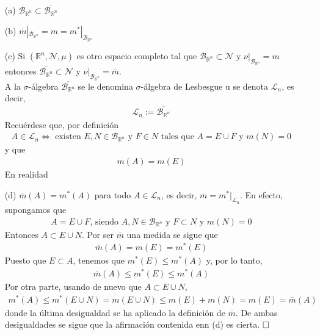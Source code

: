 \begin{enumerate}
    \item[(a)] $\mathcal{B}_{\mathbb{R}^n} \subset \overline{\mathcal{B}_{\mathbb{R}^n}}$
    \item[(b)] $\overline{m}|_{\mathcal{B}_{\mathbb{R}^n}} = m = m^*|_{\mathcal{B}_{\mathbb{R}^n}}$
    \item[(c)] Si $(\mathbb{R}^n, \mathcal{N}, \mu)$ es otro espacio completo tal que $\mathcal{B}_{\mathbb{R}^n} \subset \mathcal{N}$ y $\nu |_{\mathcal{B}_{\mathbb{R}^n}} = m$ entonces $\overline{\mathcal{B}_{\mathbb{R}^n}} \subset \mathcal{N}$ y $\nu |_{\overline{\mathcal{B}_{\mathbb{R}^n}}} = \overline{m}$.
    \\
    \newline
    A la $\sigma$-álgebra $\overline{\mathcal{B}_{\mathbb{R}^n}}$ se le denomina $\sigma$-álgebra de Lesbesgue u se denota $\mathcal{L}_n$, es decir,
    \begin{align*}
        \mathcal{L}_n := \overline{\mathcal{B}_{\mathbb{R}^n}}
    \end{align*}
    Recuérdese que, por definición
    \begin{align*}
        A \in \mathcal{L}_n \Longleftrightarrow \text{ existen } E, N \in \mathcal{B}_{\mathbb{R}^n} \text{ y } F \in N \text{ tales que } A = E \cup F \text{ y } m(N) = 0
    \end{align*}
    y que
    \begin{align*}
        m(A) = m(E)
    \end{align*}
    En realidad
    \item[(d)] $\overline{m}(A) = m^*(A)$ para todo $A \in \mathcal{L}_n$, es decir, $\overline{m} = m^*|_{\mathcal{L}_n}$. En efecto, supongamos que 
    \begin{align*}
        A = E \cup F \text{, siendo } A,N \in \mathcal{B}_{\mathbb{R}^n} \text{ y } F \subset N \text{ y } m(N) = 0
    \end{align*} 
    Entonces $A \subset E \cup N$. Por ser $\overline{m}$ una medida se sigue que
    \begin{align*}
        \overline{m}(A) = m(E) = m^*(E)
    \end{align*}
    Puesto que $E \subset A$, tenemos que $m^*(E) \leq m^*(A)$ y, por lo tanto,
    \begin{align*}
        \overline{m}(A) \leq m^*(E) \leq m^*(A)
    \end{align*}
    Por otra parte, usando de nuevo que $A \subset E \cup N$,
    \begin{align*}
        m^*(A) \leq m^*(E \cup N) = m(E \cup N) \leq m(E) + m(N) = m(E) = \overline{m}(A)
    \end{align*}
    donde la última desigualdad se ha aplicado la definición de $\overline{m}$. De ambas desigualdades se sigue que la afirmación contenida enn (d) es cierta.
    $\hfill{\square}$
\end{enumerate}
